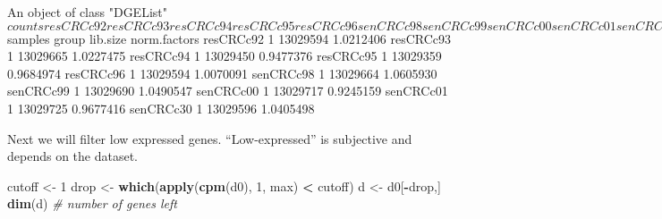 \documentclass[
]{article}
\newenvironment{Shaded}{\begin{snugshade}}{\end{snugshade}}
\newcommand{\CommentTok}[1]{\textcolor[rgb]{0.56,0.35,0.01}{\textit{#1}}}
\newcommand{\DecValTok}[1]{\textcolor[rgb]{0.00,0.00,0.81}{#1}}
\newcommand{\FunctionTok}[1]{\textcolor[rgb]{0.13,0.29,0.53}{\textbf{#1}}}
\newcommand{\NormalTok}[1]{#1}
\newcommand{\OtherTok}[1]{\textcolor[rgb]{0.56,0.35,0.01}{#1}}
\newcommand{\SpecialCharTok}[1]{\textcolor[rgb]{0.81,0.36,0.00}{\textbf{#1}}}
\begin{document}
\begin{Shaded}
\begin{Highlighting}[]
\NormalTok{An object of class "DGEList"}
\NormalTok{$counts}
\NormalTok{                  resCRCc92 resCRCc93 resCRCc94 resCRCc95 resCRCc96 senCRCc98 senCRCc99 senCRCc00 senCRCc01 senCRCc30}
\NormalTok{ENSG00000000003.15    357.80    274.40     548.9    288.35    578.45    638.75     781.5     304.5     378.2     517.8}
\NormalTok{ENSG00000000419.14    530.60    499.75     509.0    372.85    361.90   1168.40    1009.1     640.7     714.8     475.5}
\NormalTok{ENSG00000000457.14    224.80    219.90     123.2     78.00    152.30    105.00     118.3      98.4     144.6     675.5}
\NormalTok{ENSG00000000460.17    264.40    101.80     215.3    312.20    197.20    221.90     170.3     107.7     121.0     183.4}
\NormalTok{ENSG00000001036.14    640.65    588.80     929.9    869.95    891.40    468.50     275.7     600.4    1102.4    1424.8}
\NormalTok{ 16944 more rows ...}
 
\NormalTok{ $samples}
\NormalTok{           group lib.size norm.factors}
\NormalTok{resCRCc92     1 13029594    1.0212406}
\NormalTok{resCRCc93     1 13029665    1.0227475}
\NormalTok{resCRCc94     1 13029450    0.9477376}
\NormalTok{resCRCc95     1 13029359    0.9684974}
\NormalTok{resCRCc96     1 13029594    1.0070091}
\NormalTok{senCRCc98     1 13029664    1.0605930}
\NormalTok{senCRCc99     1 13029690    1.0490547}
\NormalTok{senCRCc00     1 13029717    0.9245159}
\NormalTok{senCRCc01     1 13029725    0.9677416}
\NormalTok{senCRCc30     1 13029596    1.0405498}
\end{Highlighting}
\end{Shaded}

Next we will filter low expressed genes. ``Low-expressed'' is subjective
and depends on the dataset.

\begin{Shaded}
\begin{Highlighting}[]
\NormalTok{cutoff }\OtherTok{\textless{}{-}} \DecValTok{1}
\NormalTok{drop }\OtherTok{\textless{}{-}} \FunctionTok{which}\NormalTok{(}\FunctionTok{apply}\NormalTok{(}\FunctionTok{cpm}\NormalTok{(d0), }\DecValTok{1}\NormalTok{, max) }\SpecialCharTok{\textless{}}\NormalTok{ cutoff)}
\NormalTok{d }\OtherTok{\textless{}{-}}\NormalTok{ d0[}\SpecialCharTok{{-}}\NormalTok{drop,] }
\FunctionTok{dim}\NormalTok{(d) }\CommentTok{\# number of genes left}
\end{Highlighting}
\end{Shaded}
\end{document}
